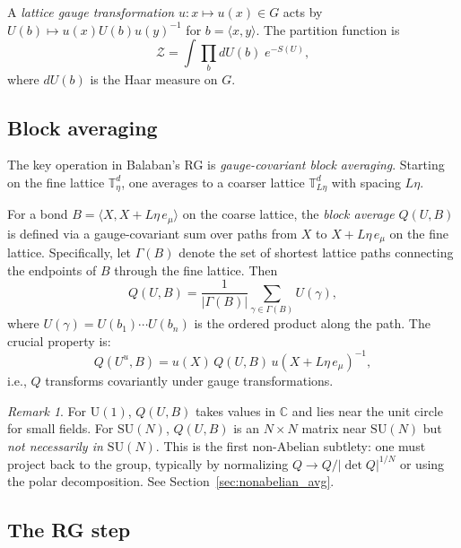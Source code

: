 \documentclass[11pt,a4paper]{article}
\theoremstyle{plain}
\theoremstyle{definition}
\theoremstyle{remark}
\newtheorem{remark}[theorem]{Remark}
\newcommand{\T}{\mathbb{T}}
\newcommand{\SU}{\mathrm{SU}}
\newcommand{\U}{\mathrm{U}}
\newcommand{\cZ}{\mathcal{Z}}
\begin{document}
A \emph{lattice gauge transformation} $u: x \mapsto u(x) \in G$
acts by $U(b) \mapsto u(x) U(b) u(y)^{-1}$ for $b = \langle x,y\rangle$.
The partition function is
\begin{equation}
  \cZ = \int \prod_b dU(b)\; e^{-S(U)},
\end{equation}
where $dU(b)$ is the Haar measure on $G$.

\subsection{Block averaging}\label{sec:block_avg}

The key operation in Balaban's RG is
\emph{gauge-covariant block averaging}.
Starting on the fine lattice $\T_\eta^d$, one averages
to a coarser lattice $\T_{L\eta}^d$ with spacing $L\eta$.

For a bond $B = \langle X, X + L\eta\, e_\mu \rangle$
on the coarse lattice, the \emph{block average} $Q(U, B)$
is defined via a gauge-covariant sum over paths
from $X$ to $X + L\eta\, e_\mu$ on the fine lattice.
Specifically, let $\Gamma(B)$ denote the set of
shortest lattice paths connecting the endpoints of $B$
through the fine lattice. Then
\begin{equation}\label{eq:block_avg}
  Q(U, B) = \frac{1}{|\Gamma(B)|} \sum_{\gamma \in \Gamma(B)}
  U(\gamma),
\end{equation}
where $U(\gamma) = U(b_1) \cdots U(b_n)$ is the ordered
product along the path. The crucial property is:
\begin{equation}
  Q(U^u, B) = u(X)\, Q(U, B)\, u(X + L\eta\, e_\mu)^{-1},
\end{equation}
i.e., $Q$ transforms covariantly under gauge transformations.

\begin{remark}
  For $\U(1)$, $Q(U,B)$ takes values in $\mathbb{C}$
  and lies near the unit circle for small fields.
  For $\SU(N)$, $Q(U,B)$ is an $N \times N$ matrix
  near $\SU(N)$ but \emph{not necessarily in $\SU(N)$}.
  This is the first non-Abelian subtlety: one must
  project back to the group, typically by normalizing
  $Q \to Q / |\det Q|^{1/N}$ or using the polar
  decomposition. See Section~\ref{sec:nonabelian_avg}.
\end{remark}

\subsection{The RG step}\label{sec:rg_step}
\end{document}
